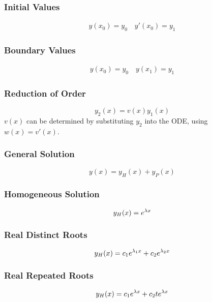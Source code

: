 \documentclass{article}
\begin{document}
\begin{multicols}{3}
    \subsubsection*{Initial Values}
    \begin{align*}
        y(x_0) = y_0 \quad y'(x_0) = y_1
    \end{align*}
    \subsubsection*{Boundary Values}
    \begin{align*}
        y(x_0) = y_0 \quad y(x_1) = y_1
    \end{align*}
    \subsubsection*{Reduction of Order}
    \begin{equation*}
        y_2(x) = v\left(x\right) y_1(x)
    \end{equation*}
    $v(x)$ can be determined by substituting $y_2$ into the ODE, using $w(x) = v'(x)$.
    \subsubsection*{General Solution}
    \begin{equation*}
        y(x) = y_H(x) + y_P(x)
    \end{equation*}
    \subsubsection*{Homogeneous Solution}
    \begin{equation*}
        y_H(x) = e^{\lambda x}
    \end{equation*}
    \subsubsection*{Real Distinct Roots}
    \begin{equation*}
        y_H(x) = c_1e^{\lambda_1 x} + c_2e^{\lambda_2 x}
    \end{equation*}
    \subsubsection*{Real Repeated Roots}
    \begin{equation*}
        y_H(x) = c_1e^{\lambda x} + c_2 te^{\lambda x}
    \end{equation*}

\end{multicols}
\end{document}
